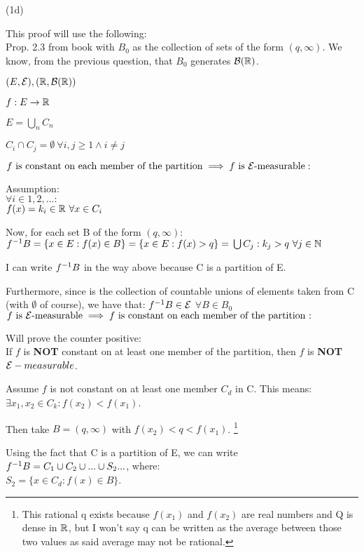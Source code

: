 \def\emeas{\calE-measurable}
\def\BR{\borel{(\R)}}
\def\R{\bbR}
\def\ep{\calE}
(1d)

This proof will use the following: \\
Prop. 2.3 from book with $B_0$ as the collection of sets of the form $(q, \infty)$. We know, from the previous question, that $B_0$ generates $\BR$.

$ (E, \cal{E}), (\R, \BR) $

$f: E \rightarrow \R$

$E = \bigcup_n{C_n}$

$C_i \cap C_j = \emptyset \ \forall i, j \geq 1 \land i \neq j $

\textbf{$ f \text{ is constant on each member of the partition} \implies f \text{ is } \mathcal{E} \text{-measurable}  :$}

Assumption:\\
$ \forall i \in 1, 2, ...:$ \\
$f(x) = k_i \in \R \ \forall x \in C_i$


Now, for each set B of the form $(q, \infty)$:
$
f^{-1}{B}
= 
\{
x \in E : f(x) \in B
\}
=
\{
x \in E : f(x) > q
\}
= \\
\bigcup C_{j}: k_j > q \ \forall j \in \mathbb{N}
$

I can write $f^{-1}{B}$ in the way above because C is a partition of E.

Furthermore, since  is the collection of countable unions of elements taken from C (with $\emptyset$ of course), we have that:
$f^{-1}{B} \in \cal{E} $
$\forall B \in B_0$
\\

\textbf{$f \text{ is } \mathcal{E} \text{-measurable} \implies f \text{ is constant on each member of the partition :}$}

Will prove the counter positive: \\
If $f$ is \textbf{NOT} constant on at least one member of the partition, then $f$ is \textbf{NOT} $\mathcal{E}-measurable$.

Assume $f$ is not constant on at least one member $C_d$ in C. This means:
$ \exists x_1, x_2 \in C_k: f(x_2) < f(x_1) $.

Then take $B = (q, \infty)$ with $f(x_2) < q < f(x_1)$.
\footnote{
This rational q exists because $f(x_1)$ and $f(x_2)$ are real numbers and Q is dense in $\R$, but I won't say q can be written as the average between those two values as said average may not be rational.
} 

Using the fact that C is a partition of E, we can write $f^{-1}{B} = C_1 \cup C_2 \cup ... \cup S_2 ... $, where: \\
$S_2 = \{ x \in C_d: f(x) \in B \} $.

